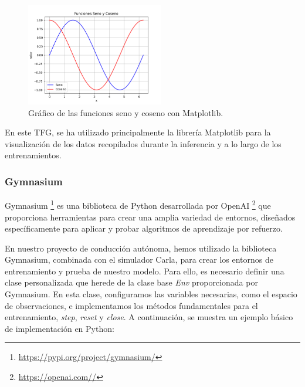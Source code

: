 \begin{figure}[ht]
  \begin{center}
    \includegraphics[width=6cm]{figs/Plataformas_Desarollo/plot.png}
  \end{center}
  \caption{Gráfico de las funciones seno y coseno con Matplotlib.}
  \label{foto_plot}
\end{figure}

En este \ac{TFG}, se ha utilizado principalmente la librería Matplotlib para la visualización de los datos recopilados durante la inferencia y a lo largo de los entrenamientos.

\subsubsection{Gymnasium}
\label{sec:gymnasium}

Gymnasium \footnote{\url{https://pypi.org/project/gymnasium/}}  es una biblioteca de Python desarrollada por OpenAI \footnote{\url{https://openai.com//}}  que proporciona herramientas para crear una amplia variedad de entornos, diseñados específicamente para aplicar y probar algoritmos de aprendizaje por refuerzo.

En nuestro proyecto de conducción autónoma, hemos utilizado la biblioteca Gymnasium, combinada con el simulador Carla, para crear los entornos de entrenamiento y prueba de nuestro modelo. Para ello, es necesario definir una clase personalizada que herede de la clase base \textit{Env} proporcionada por Gymnasium. En esta clase, configuramos las variables necesarias, como el espacio de observaciones, e implementamos los métodos fundamentales para el entrenamiento, \textit{step}, \textit{reset} y \textit{close}. A continuación, se muestra un ejemplo básico de implementación en Python:

